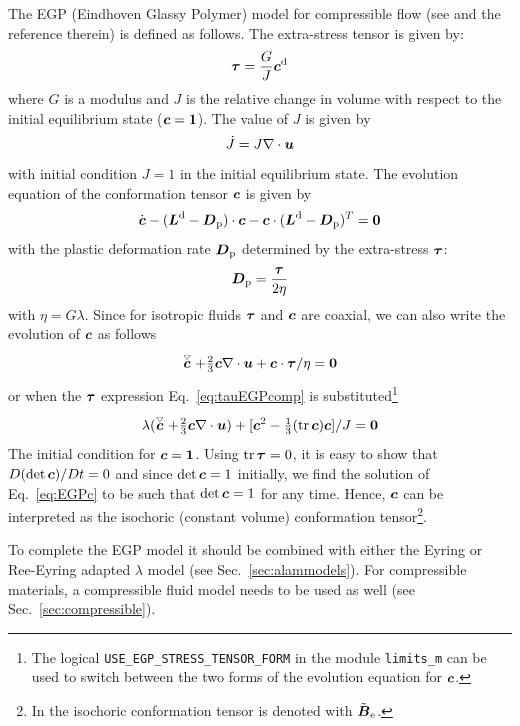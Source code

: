 \label{sec:EGPcompress}
The EGP (Eindhoven Glassy Polymer) model for compressible flow (see \cite{pagani_no_2024} and the reference therein) is defined as follows.
The extra-stress tensor is given by:
\begin{equation}
     \boldsymbol{\tau}=\frac{G}J\boldsymbol{c}^{\text{d}}
     \label{eq:tauEGPcomp}
\end{equation}
where $G$ is a modulus and $J$ is the relative change in volume with respect to the initial equilibrium state ($\boldsymbol{c}=\boldsymbol{1}$). The value of $J$ is given by
\[
    \dot J = J \nabla\cdot \boldsymbol{u}
\]
with initial condition $J=1$ in the initial equilibrium state.
The evolution equation of the conformation tensor $\boldsymbol{c}$ is given by
\begin{equation}
  \dot{\boldsymbol{c}} -(\boldsymbol{L}^\text{d}-\boldsymbol{D}_\text{p})\cdot\boldsymbol{c}
                    -\boldsymbol{c}\cdot(\boldsymbol{L}^\text{d}-\boldsymbol{D}_\text{p})^T=\boldsymbol{0}
\end{equation}
with the plastic deformation rate $\boldsymbol{D}_\text{p}$ determined by the extra-stress $\boldsymbol{\tau}$:
\[
    \boldsymbol{D}_\text{p}=\frac{\boldsymbol{\tau}}{2\eta}
\]
with $\eta=G\lambda$. Since for isotropic fluids $\boldsymbol{\tau}$ and $\boldsymbol{c}$ are coaxial, we can also write
the evolution of $\boldsymbol{c}$ as follows
\begin{equation}
  \stackrel{\scriptscriptstyle\bigtriangledown}{\boldsymbol{c}}+\tfrac23\boldsymbol{c}\nabla\cdot\boldsymbol{u} + \boldsymbol{c}\cdot\boldsymbol{\tau}/\eta=\boldsymbol{0}
  \label{eq:EGPc}
\end{equation}
or when the $\boldsymbol{\tau}$ expression Eq.~\eqref{eq:tauEGPcomp} is
substituted\footnote{The logical \texttt{USE\_EGP\_STRESS\_TENSOR\_FORM} in the module \texttt{limits\_m} can be used to switch between the two forms of the evolution equation for $\boldsymbol{c}$.}
\begin{equation}
  \lambda(\stackrel{\scriptscriptstyle\bigtriangledown}{\boldsymbol{c}} +\tfrac23\boldsymbol{c}\nabla\cdot\boldsymbol{u})+ [\boldsymbol{c}^2 -\tfrac13(\operatorname{tr}\boldsymbol{c})\boldsymbol{c}]/J=\boldsymbol{0}
\end{equation}
The initial condition for $\boldsymbol{c}=\boldsymbol{1}$. 
Using $\operatorname{tr}\boldsymbol{\tau}=0$, it is easy to show that $D (\det\boldsymbol{c}) / D t=0$
and since $\det \boldsymbol{c}=1$ initially, we find the solution of Eq.~\eqref{eq:EGPc} to be such that $\det \boldsymbol{c}=1$ for any time. Hence, $\boldsymbol{c}$ can be interpreted as the isochoric (constant volume) conformation tensor\footnote{In \cite{pagani_no_2024} the isochoric conformation tensor is denoted with $\tilde{\boldsymbol{B}}_\text{e}$.}.

To complete the EGP model it should be combined with either the Eyring or Ree-Eyring adapted $\lambda$ model (see Sec.~\ref{sec:alammodels}). For compressible materials, a compressible fluid model needs to be used as well (see Sec.~\ref{sec:compressible}).

